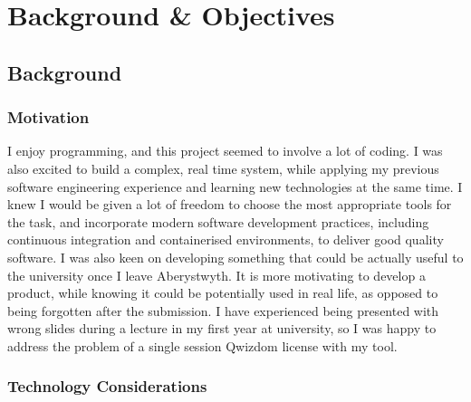\chapter{Background \& Objectives}


\section{Background}

\subsection{Motivation}
I enjoy programming, and this project seemed to involve a lot of coding. I was also excited
to build a complex, real time system, while applying my previous software engineering
experience and learning new technologies at the same time. I knew I would be given
a lot of freedom to choose the most appropriate tools for the task, and incorporate
modern software development practices, including continuous integration and
containerised environments, to deliver good quality software. I was also keen on developing something that could be actually
useful to the university once I leave Aberystwyth. It is more motivating to develop
a product, while knowing it could be potentially used in real life, as opposed to being
forgotten after the submission. I have experienced being presented with wrong slides
during a lecture in my first year at university, so I was happy to address the problem
of a single session Qwizdom license with my tool.

\subsection{Technology Considerations}
